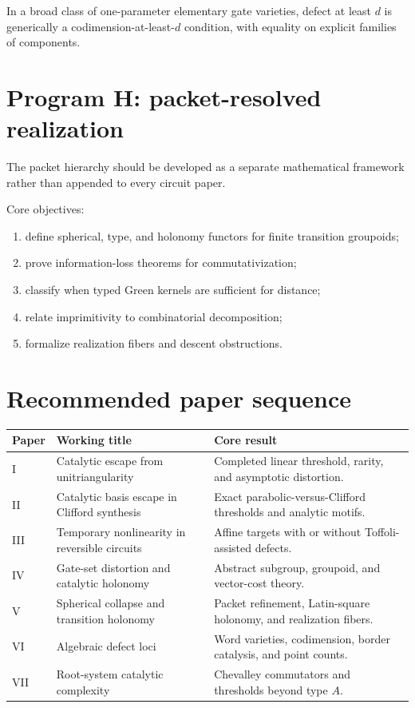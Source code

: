 \begin{conjecture}
In a broad class of one-parameter elementary gate varieties, defect at least $d$ is generically a codimension-at-least-$d$ condition, with equality on explicit families of components.
\end{conjecture}

\section{Program H: packet-resolved realization}
The packet hierarchy should be developed as a separate mathematical framework rather than appended to every circuit paper.

Core objectives:
\begin{enumerate}
\item define spherical, type, and holonomy functors for finite transition groupoids;
\item prove information-loss theorems for commutativization;
\item classify when typed Green kernels are sufficient for distance;
\item relate imprimitivity to combinatorial decomposition;
\item formalize realization fibers and descent obstructions.
\end{enumerate}

\section{Recommended paper sequence}
\begin{longtable}{@{}>{\raggedright\arraybackslash}p{}>{\raggedright\arraybackslash}p{}>{\raggedright\arraybackslash}p{}@{}}
\toprule
Paper & Working title & Core result\\
\midrule
I & Catalytic escape from unitriangularity & Completed linear threshold, rarity, and asymptotic distortion.\\
II & Catalytic basis escape in Clifford synthesis & Exact parabolic-versus-Clifford thresholds and analytic motifs.\\
III & Temporary nonlinearity in reversible circuits & Affine targets with or without Toffoli-assisted defects.\\
IV & Gate-set distortion and catalytic holonomy & Abstract subgroup, groupoid, and vector-cost theory.\\
V & Spherical collapse and transition holonomy & Packet refinement, Latin-square holonomy, and realization fibers.\\
VI & Algebraic defect loci & Word varieties, codimension, border catalysis, and point counts.\\
VII & Root-system catalytic complexity & Chevalley commutators and thresholds beyond type $A$.\\
\bottomrule
\end{longtable}

